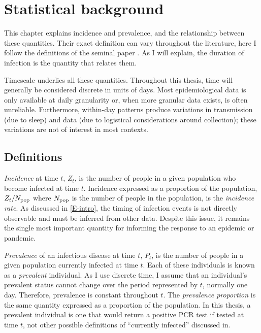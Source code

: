 \documentclass[thesis.tex]{subfiles}
\begin{document}
\chapter{Statistical background} \label{inc-prev}

This chapter explains incidence and prevalence, and the relationship between these quantities.
Their exact definition can vary throughout the literature, here I follow the definitions of the seminal paper \textcite{freemanPrevalence}.
As I will explain, the duration of infection is the quantity that relates them.

Timescale underlies all these quantities.
Throughout this thesis, time will generally be considered discrete in units of days.
Most epidemiological data is only available at daily granularity or, when more granular data exists, is often unreliable.
Furthermore, within-day patterns produce variations in transmission (\eg due to sleep) and data (\eg due to logistical considerations around collection); these variations are not of interest in most contexts.

\section{Definitions}

\emph{Incidence} at time $t$, $Z_t$, is the number of people in a given population who become infected at time $t$.
Incidence expressed as a proportion of the population, $Z_t/N_\text{pop}$ where $N_\text{pop}$ is the number of people in the population, is the \emph{incidence rate}.
As discussed in \cref{E-intro}, the timing of infection events is not directly observable and must be inferred from other data.
Despite this issue, it remains the single most important quantity for informing the response to an epidemic or pandemic.

\emph{Prevalence} of an infectious disease at time $t$, $P_t$, is the number of people in a given population currently infected at time $t$.
Each of these individuals is known as a \emph{prevalent} individual.
As I use discrete time, I assume that an individual's prevalent status cannot change over the period represented by $t$, normally one day.
Therefore, prevalence is constant throughout $t$.
The \emph{prevalence proportion} is the same quantity expressed as a proportion of the population.
In this thesis, a prevalent individual is one that would return a positive PCR test if tested at time $t$, not other possible definitions of ``currently infected'' discussed in.
\end{document}

